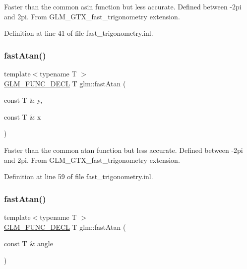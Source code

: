 Faster than the common asin function but less accurate. Defined between -\/2pi and 2pi. From G\+L\+M\+\_\+\+G\+T\+X\+\_\+fast\+\_\+trigonometry extension. 

Definition at line 41 of file fast\+\_\+trigonometry.\+inl.

\mbox{\label{group__gtx__fast__trigonometry_gaf6234384b94846e29cf2c51dc245d484}} 
\subsubsection{\texorpdfstring{fast\+Atan()}{fastAtan()}\hspace{0.1cm}{\footnotesize\ttfamily [1/2]}}
{\footnotesize\ttfamily template$<$typename T $>$ \\
\hyperlink{setup_8hpp_ab2d052de21a70539923e9bcbf6e83a51}{G\+L\+M\+\_\+\+F\+U\+N\+C\+\_\+\+D\+E\+CL} T glm\+::fast\+Atan (\begin{DoxyParamCaption}\item[{const T \&}]{y,  }\item[{const T \&}]{x }\end{DoxyParamCaption})}

Faster than the common atan function but less accurate. Defined between -\/2pi and 2pi. From G\+L\+M\+\_\+\+G\+T\+X\+\_\+fast\+\_\+trigonometry extension. 

Definition at line 59 of file fast\+\_\+trigonometry.\+inl.

\mbox{\label{group__gtx__fast__trigonometry_ga49b3b2b777b83eeed3e11205e800027e}} 
\subsubsection{\texorpdfstring{fast\+Atan()}{fastAtan()}\hspace{0.1cm}{\footnotesize\ttfamily [2/2]}}
{\footnotesize\ttfamily template$<$typename T $>$ \\
\hyperlink{setup_8hpp_ab2d052de21a70539923e9bcbf6e83a51}{G\+L\+M\+\_\+\+F\+U\+N\+C\+\_\+\+D\+E\+CL} T glm\+::fast\+Atan (\begin{DoxyParamCaption}\item[{const T \&}]{angle }\end{DoxyParamCaption})}

